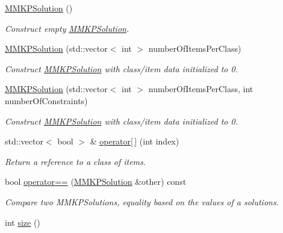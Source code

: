 \begin{DoxyCompactItemize}
\item 
\hyperlink{class_m_m_k_p_solution_a5fd2fe696c0910f8a9193e7366a2c730}{M\+M\+K\+P\+Solution} ()
\begin{DoxyCompactList}\small\item\em Construct empty \hyperlink{class_m_m_k_p_solution}{M\+M\+K\+P\+Solution}. \end{DoxyCompactList}\item 
\hyperlink{class_m_m_k_p_solution_a7dac8058bd2616c791ead1d4cea079d7}{M\+M\+K\+P\+Solution} (std\+::vector$<$ int $>$ number\+Of\+Items\+Per\+Class)
\begin{DoxyCompactList}\small\item\em Construct \hyperlink{class_m_m_k_p_solution}{M\+M\+K\+P\+Solution} with class/item data initialized to 0. \end{DoxyCompactList}\item 
\hyperlink{class_m_m_k_p_solution_a5cf2c38982a333811a35834c7dfb85fb}{M\+M\+K\+P\+Solution} (std\+::vector$<$ int $>$ number\+Of\+Items\+Per\+Class, int number\+Of\+Constraints)
\begin{DoxyCompactList}\small\item\em Construct \hyperlink{class_m_m_k_p_solution}{M\+M\+K\+P\+Solution} with class/item data initialized to 0. \end{DoxyCompactList}\item 
std\+::vector$<$ bool $>$ \& \hyperlink{class_m_m_k_p_solution_a26255ff2f59ddf026005ef1d1be05c91}{operator\mbox{[}$\,$\mbox{]}} (int index)
\begin{DoxyCompactList}\small\item\em Return a reference to a class of items. \end{DoxyCompactList}\item 
bool \hyperlink{class_m_m_k_p_solution_aa69da4d40a0adf4c3facb59e935b0fa8}{operator==} (\hyperlink{class_m_m_k_p_solution}{M\+M\+K\+P\+Solution} \&other) const 
\begin{DoxyCompactList}\small\item\em Compare two M\+M\+K\+P\+Solutions, equality based on the values of a solutions. \end{DoxyCompactList}\item 
\hypertarget{class_m_m_k_p_solution_a2f2dcb054e955883c81d96d1835fae5b}{int \hyperlink{class_m_m_k_p_solution_a2f2dcb054e955883c81d96d1835fae5b}{size} ()}\label{class_m_m_k_p_solution_a2f2dcb054e955883c81d96d1835fae5b}


\end{DoxyCompactItemize}
